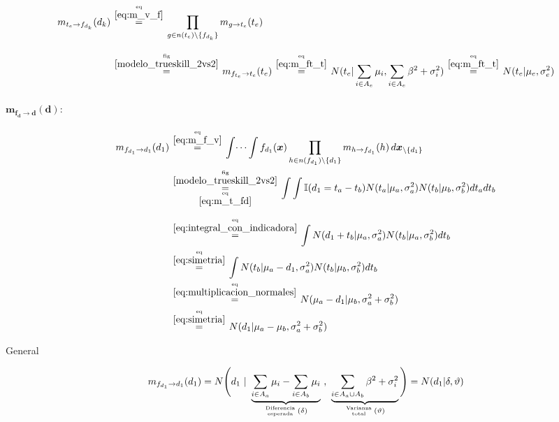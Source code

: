 \documentclass[article]{jss}
\newcommand\hfrac[2]{\genfrac{}{}{0pt}{}{#1}{#2}} %
\begin{document}
\begin{appendix}
\begin{equation}\label{eq:m_t_fd}
\begin{split}
m_{t_e \rightarrow f_{d_{k}}}(d_{k}) & \overset{\hfrac{\text{eq}}{\ref{eq:m_v_f}}}{=} \prod_{g \in n(t_e) \setminus  \{f_{d_{k}} \}} m_{g \rightarrow t_e} (t_e) \\[0.3cm] 
 & \overset{\hfrac{\text{fig}}{\ref{modelo_trueskill_2vs2}}}{=} m_{f_{t_e} \rightarrow t_e}(t_e) \overset{\hfrac{\text{eq}}{\ref{eq:m_ft_t}}}{=} N(t_e| \sum_{i \in A_e} \mu_i, \sum_{i \in A_e} \beta^2 + \sigma_i^2) \overset{\hfrac{\text{eq}}{\ref{eq:m_ft_t}}}{=} N(t_e|\mu_e,\sigma_e^2)
\end{split}
\end{equation}

\paragraph{$\bm{m_{f_d \rightarrow d}(d)}:$}

\begin{equation}
 \begin{split}
  m_{f_{d_1} \rightarrow d_1}(d_1) & \overset{\hfrac{\text{eq}}{\ref{eq:m_f_v}}}{=} \int \dots \int f_{d_1}(\bm{x}) \prod_{h \in n(f_{d_1}) \setminus \{d_1\} } m_{h \rightarrow f_{d_1}}(h) \, d\bm{x}_{\setminus \{d_1\} }  \\
  & \overset{\hfrac{\text{fig}}{\ref{modelo_trueskill_2vs2}}}{\underset{\hfrac{\text{eq}}{\ref{eq:m_t_fd}}}{=}} \int \int \mathbb{I}(d_1 = t_a - t_b) N(t_a| \mu_a, \sigma_a^2)  N(t_b| \mu_b, \sigma_b^2)  dt_adt_b \\[0.25cm]
  & \overset{\hfrac{\text{eq}}{\ref{eq:integral_con_indicadora}}}{=} \int N(d_1 + t_b| \mu_a, \sigma_a^2)  N(t_b| \mu_a, \sigma_b^2)  dt_b \\
  & \overset{\hfrac{\text{eq}}{\ref{eq:simetria}}}{=} \int N(t_b| \mu_a - d_1 , \sigma_a^2)  N(t_b| \mu_b, \sigma_b^2)  dt_b \\
  & \overset{\hfrac{\text{eq}}{\ref{eq:multiplicacion_normales}}}{=} N( \mu_a - d_1 | \mu_b, \sigma_a^2 +\sigma_b^2  ) \\
  & \overset{\hfrac{\text{eq}}{\ref{eq:simetria}}}{=} N( d_1 | \mu_a - \mu_b, \sigma_a^2 +\sigma_b^2  )
 \end{split}
\end{equation}

General

\begin{equation} \label{eq:m_fd_d}
 m_{f_{d_1} \rightarrow d_1}(d_1) = N\Bigg(d_1 \ | \ \underbrace{\sum_{i \in A_a} \mu_i - \sum_{i \in A_b} \mu_i}_{\hfrac{\text{Diferencia}}{\text{esperada}} \, (\delta)} \ , \  \underbrace{\sum_{i \in A_a \cup A_b} \beta^2 + \sigma_i^2}_{\hfrac{\text{Varianza}}{\text{total}} \, (\vartheta) } \Bigg) = N(d_1 | \delta, \vartheta)
\end{equation}


\end{appendix}
\end{document}
